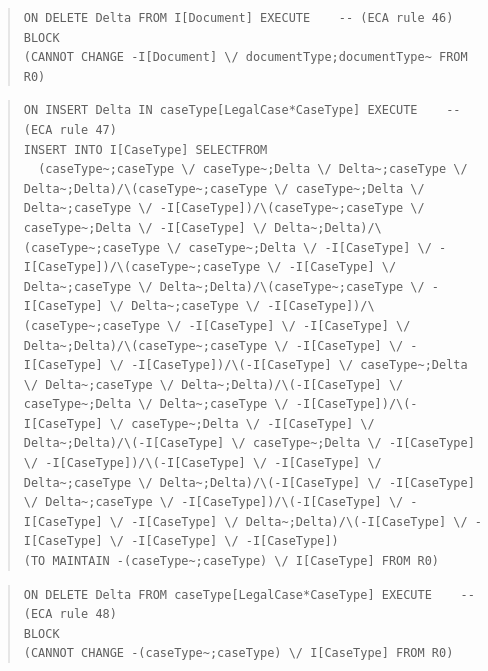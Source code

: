 \documentclass[10pt,a4paper]{report}              %
\theoremstyle{plain}\theorembodyfont{\rmfamily}\newtheorem{definition}{Definition}[section]
\theoremstyle{plain}\theorembodyfont{\rmfamily}\newtheorem{designrule}[definition]{Requirement}
\begin{document}
\begin{quote}
\begin{verbatim}
ON DELETE Delta FROM I[Document] EXECUTE    -- (ECA rule 46)
BLOCK
(CANNOT CHANGE -I[Document] \/ documentType;documentType~ FROM R0)
\end{verbatim}
\end{quote}
\begin{quote}
\begin{verbatim}
ON INSERT Delta IN caseType[LegalCase*CaseType] EXECUTE    -- (ECA rule 47)
INSERT INTO I[CaseType] SELECTFROM
  (caseType~;caseType \/ caseType~;Delta \/ Delta~;caseType \/ Delta~;Delta)/\(caseType~;caseType \/ caseType~;Delta \/ Delta~;caseType \/ -I[CaseType])/\(caseType~;caseType \/ caseType~;Delta \/ -I[CaseType] \/ Delta~;Delta)/\(caseType~;caseType \/ caseType~;Delta \/ -I[CaseType] \/ -I[CaseType])/\(caseType~;caseType \/ -I[CaseType] \/ Delta~;caseType \/ Delta~;Delta)/\(caseType~;caseType \/ -I[CaseType] \/ Delta~;caseType \/ -I[CaseType])/\(caseType~;caseType \/ -I[CaseType] \/ -I[CaseType] \/ Delta~;Delta)/\(caseType~;caseType \/ -I[CaseType] \/ -I[CaseType] \/ -I[CaseType])/\(-I[CaseType] \/ caseType~;Delta \/ Delta~;caseType \/ Delta~;Delta)/\(-I[CaseType] \/ caseType~;Delta \/ Delta~;caseType \/ -I[CaseType])/\(-I[CaseType] \/ caseType~;Delta \/ -I[CaseType] \/ Delta~;Delta)/\(-I[CaseType] \/ caseType~;Delta \/ -I[CaseType] \/ -I[CaseType])/\(-I[CaseType] \/ -I[CaseType] \/ Delta~;caseType \/ Delta~;Delta)/\(-I[CaseType] \/ -I[CaseType] \/ Delta~;caseType \/ -I[CaseType])/\(-I[CaseType] \/ -I[CaseType] \/ -I[CaseType] \/ Delta~;Delta)/\(-I[CaseType] \/ -I[CaseType] \/ -I[CaseType] \/ -I[CaseType])
(TO MAINTAIN -(caseType~;caseType) \/ I[CaseType] FROM R0)
\end{verbatim}
\end{quote}
\begin{quote}
\begin{verbatim}
ON DELETE Delta FROM caseType[LegalCase*CaseType] EXECUTE    -- (ECA rule 48)
BLOCK
(CANNOT CHANGE -(caseType~;caseType) \/ I[CaseType] FROM R0)
\end{verbatim}
\end{quote}
\end{document}

